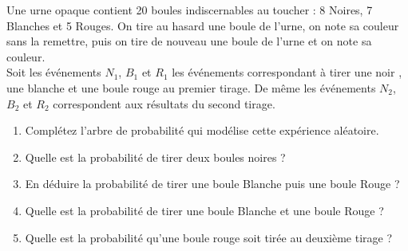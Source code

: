 \documentclass[main.tex]{subfiles}
\begin{document}
\begin{exercise}
{ 
	}
	\hfill 
	\parbox{0.6\linewidth}{Une urne opaque contient 20 boules indiscernables au toucher : 8 Noires, 7 Blanches et 5 Rouges.  	On tire au hasard une boule de l'urne, on note sa couleur sans la remettre, puis on tire de nouveau une boule de l'urne et on note sa couleur.\\
		Soit les événements $N_1$, $B_1$ et $R_1$ les événements correspondant à tirer une noir , une blanche et une boule rouge au premier tirage. De même les événements $N_2$, $B_2$ et $R_2$ correspondent aux résultats du second tirage.
		\begin{enumerate}[leftmargin=*, label=\arabic*)]
			\item Complétez l'arbre de probabilité qui modélise cette expérience aléatoire.
			\item Quelle est la probabilité de tirer deux boules noires ?
			\item En déduire la probabilité de tirer une boule Blanche puis une boule Rouge ?
			\item Quelle est la probabilité de tirer une boule Blanche et une boule Rouge ?  
			\item Quelle est la probabilité qu'une boule rouge soit tirée au deuxième tirage ?
		\end{enumerate}	
	}
\end{exercise}
\end{document}
